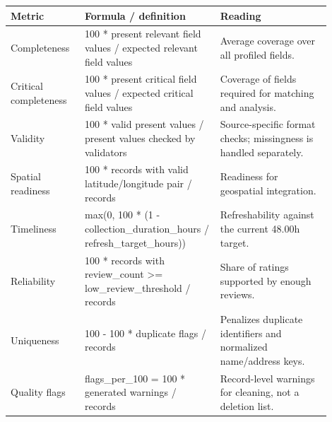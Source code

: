 {\scriptsize
\begin{tabular}{p{0.21\linewidth}p{0.37\linewidth}p{0.32\linewidth}}
\toprule
Metric & Formula / definition & Reading \\
\midrule
Completeness & 100 * present relevant field values / expected relevant field values & Average coverage over all profiled fields. \\
Critical completeness & 100 * present critical field values / expected critical field values & Coverage of fields required for matching and analysis. \\
Validity & 100 * valid present values / present values checked by validators & Source-specific format checks; missingness is handled separately. \\
Spatial readiness & 100 * records with valid latitude/longitude pair / records & Readiness for geospatial integration. \\
Timeliness & max(0, 100 * (1 - collection\_duration\_hours / refresh\_target\_hours)) & Refreshability against the current 48.00h target. \\
Reliability & 100 * records with review\_count >= low\_review\_threshold / records & Share of ratings supported by enough reviews. \\
Uniqueness & 100 - 100 * duplicate flags / records & Penalizes duplicate identifiers and normalized name/address keys. \\
Quality flags & flags\_per\_100 = 100 * generated warnings / records & Record-level warnings for cleaning, not a deletion list. \\
\bottomrule
\end{tabular}
}
